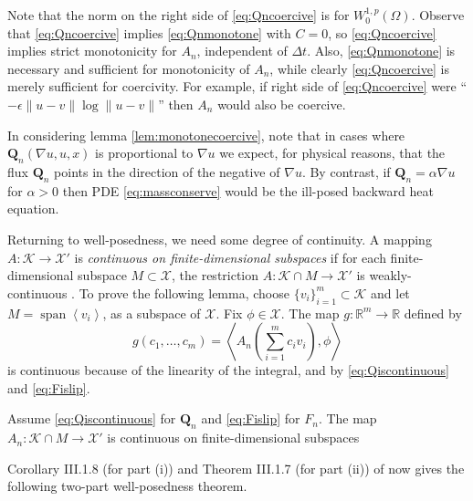 \documentclass[final,leqno,onefignum,onetabnum]{siamltex1213bueler}
\newcommand\bQ{\mathbf{Q}}
\newcommand\eps{\epsilon}
\renewcommand{\grad}{\nabla}
\newcommand{\ip}[2]{\ensuremath{\left<#1,#2\right>}}
\newcommand\RR{\mathbb{R}}
\begin{document}
Note that the norm on the right side of \eqref{eq:Qncoercive} is for $W_0^{1,p}(\Omega)$.  Observe that \eqref{eq:Qncoercive} implies \eqref{eq:Qnmonotone} with $C=0$, so \eqref{eq:Qncoercive} implies strict monotonicity for $A_n$, independent of $\Delta t$.  Also, \eqref{eq:Qnmonotone} is necessary and sufficient for monotonicity of $A_n$, while clearly \eqref{eq:Qncoercive} is merely sufficient for coercivity.  For example, if right side of \eqref{eq:Qncoercive} were ``$-\eps \|u-v\| \log \|u-v\|$'' then $A_n$ would also be coercive.

In considering lemma \ref{lem:monotonecoercive}, note that in cases where $\bQ_n(\grad u,u,x)$ is proportional to $\grad u$ we expect, for physical reasons, that the flux $\bQ_n$ points in the direction of the negative of $\grad u$.  By contrast, if $\bQ_n = \alpha \grad u$ for $\alpha>0$ then PDE \eqref{eq:massconserve} would be the ill-posed backward heat equation.

Returning to well-posedness, we need some degree of continuity.  A mapping $A : \mathcal{K} \to \mathcal{X}'$ is \emph{continuous on finite-dimensional subspaces} if for each finite-dimensional subspace $M\subset \mathcal{X}$, the restriction $A : \mathcal{K}\cap M \to \mathcal{X}'$ is weakly-continuous \cite{KinderlehrerStampacchia}.  To prove the following lemma, choose $\{v_i\}_{i=1}^m \subset \mathcal{K}$ and let $M=\operatorname{span}\left<v_i\right>$, as a subspace of $\mathcal{X}$.  Fix $\phi\in\mathcal{X}$.  The map $g:\RR^m \to \RR$ defined by
\begin{equation}
  g(c_1,\dots,c_m) = \ip{A_n\left(\sum_{i=1}^m c_i v_i\right)}{\phi}
\end{equation}
is continuous because of the linearity of the integral, and by \eqref{eq:Qiscontinuous} and \eqref{eq:Fislip}.

\medskip
\begin{lemma}  \label{lem:continuous}  Assume \eqref{eq:Qiscontinuous} for $\bQ_n$ and \eqref{eq:Fislip} for $F_n$.  The map $A_n : \mathcal{K}\cap M \to \mathcal{X}'$ is continuous on finite-dimensional subspaces
\end{lemma}

\medskip
Corollary III.1.8 (for part (i)) and Theorem III.1.7 (for part (ii)) of \cite{KinderlehrerStampacchia} now gives the following two-part well-posedness theorem.
\end{document}

